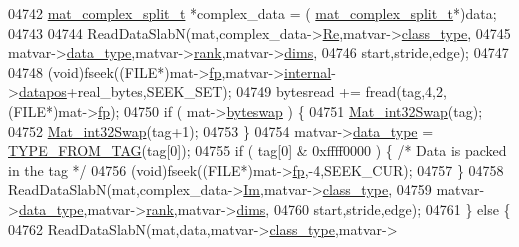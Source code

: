 \begin{DoxyCode}
{{{{{{{{{{{{{{{{{{{{{{{{{{{04742                 \hyperlink{group___m_a_t_structmat__complex__split__t}{mat\_complex\_split\_t} *complex\_data = (
      \hyperlink{group___m_a_t_structmat__complex__split__t}{mat\_complex\_split\_t}*)data;
04743 
04744                 ReadDataSlabN(mat,complex\_data->\hyperlink{group___m_a_t_a484a93607508adac2bce53a0252e0325}{Re},matvar->\hyperlink{group___m_a_t_aff13035bf3265dd7d9425e5d40c839d4}{class\_type},
04745                     matvar->\hyperlink{group___m_a_t_ab6aafe9bd77f0f077852593dec438144}{data\_type},matvar->\hyperlink{group___m_a_t_a84ba70c96ded13cc555fa75b768d9921}{rank},matvar->\hyperlink{group___m_a_t_a8e01234e1c862ce3472bb37f5a09b92c}{dims},
04746                     start,stride,edge);
04747 
04748                 (void)fseek((FILE*)mat->\hyperlink{struct__mat__t_a85f562e407ca9ad4d2a6e14f839432b7}{fp},matvar->\hyperlink{group___m_a_t_a6e97e3ed9f40c49322c18561c2a94e92}{internal}->\hyperlink{structmatvar__internal_afd3bfaab126a160bd6855563e1ea0a7e}{datapos}+real\_bytes,SEEK\_SET);
04749                 bytesread += fread(tag,4,2,(FILE*)mat->\hyperlink{struct__mat__t_a85f562e407ca9ad4d2a6e14f839432b7}{fp});
04750                 \textcolor{keywordflow}{if} ( mat->\hyperlink{struct__mat__t_a99d207977af5e04941ace56d71817a40}{byteswap} ) \{
04751                     \hyperlink{endian_8c_a2e0153996243f0a34df9a5286087cfa3}{Mat\_int32Swap}(tag);
04752                     \hyperlink{endian_8c_a2e0153996243f0a34df9a5286087cfa3}{Mat\_int32Swap}(tag+1);
04753                 \}
04754                 matvar->\hyperlink{group___m_a_t_ab6aafe9bd77f0f077852593dec438144}{data\_type} = \hyperlink{mat5_8c_a82bacecc4afc633b61bc3dc8ef88d1ed}{TYPE\_FROM\_TAG}(tag[0]);
04755                 \textcolor{keywordflow}{if} ( tag[0] & 0xffff0000 ) \{ \textcolor{comment}{/* Data is packed in the tag */}
04756                     (void)fseek((FILE*)mat->\hyperlink{struct__mat__t_a85f562e407ca9ad4d2a6e14f839432b7}{fp},-4,SEEK\_CUR);
04757                 \}
04758                 ReadDataSlabN(mat,complex\_data->\hyperlink{group___m_a_t_a7182d10b0d3598415887376065440946}{Im},matvar->\hyperlink{group___m_a_t_aff13035bf3265dd7d9425e5d40c839d4}{class\_type},
04759                     matvar->\hyperlink{group___m_a_t_ab6aafe9bd77f0f077852593dec438144}{data\_type},matvar->\hyperlink{group___m_a_t_a84ba70c96ded13cc555fa75b768d9921}{rank},matvar->\hyperlink{group___m_a_t_a8e01234e1c862ce3472bb37f5a09b92c}{dims},
04760                     start,stride,edge);
04761             \} \textcolor{keywordflow}{else} \{
04762                 ReadDataSlabN(mat,data,matvar->\hyperlink{group___m_a_t_aff13035bf3265dd7d9425e5d40c839d4}{class\_type},matvar->
}}}}}}}}}}}}}}}}}}}}}}}}}}}
\end{DoxyCode}
